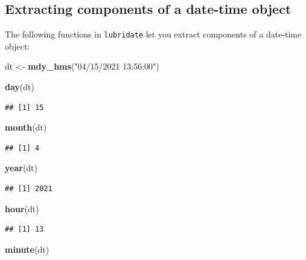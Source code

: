 \documentclass[
]{book}
\newenvironment{Shaded}{\begin{snugshade}}{\end{snugshade}}
\newcommand{\FunctionTok}[1]{\textcolor[rgb]{0.13,0.29,0.53}{\textbf{#1}}}
\newcommand{\NormalTok}[1]{#1}
\newcommand{\OtherTok}[1]{\textcolor[rgb]{0.56,0.35,0.01}{#1}}
\newcommand{\StringTok}[1]{\textcolor[rgb]{0.31,0.60,0.02}{#1}}
\begin{document}
\hypertarget{extracting-components-of-a-date-time-object}{%
\subsection{Extracting components of a date-time object}\label{extracting-components-of-a-date-time-object}}

The following functions in \texttt{lubridate} let you extract components of a date-time object:

\begin{Shaded}
\begin{Highlighting}[]
\NormalTok{dt }\OtherTok{\textless{}{-}} \FunctionTok{mdy\_hms}\NormalTok{(}\StringTok{"04/15/2021 13:56:00"}\NormalTok{)}

\FunctionTok{day}\NormalTok{(dt)}
\end{Highlighting}
\end{Shaded}

\begin{verbatim}
## [1] 15
\end{verbatim}

\begin{Shaded}
\begin{Highlighting}[]
\FunctionTok{month}\NormalTok{(dt)}
\end{Highlighting}
\end{Shaded}

\begin{verbatim}
## [1] 4
\end{verbatim}

\begin{Shaded}
\begin{Highlighting}[]
\FunctionTok{year}\NormalTok{(dt)}
\end{Highlighting}
\end{Shaded}

\begin{verbatim}
## [1] 2021
\end{verbatim}

\begin{Shaded}
\begin{Highlighting}[]
\FunctionTok{hour}\NormalTok{(dt)}
\end{Highlighting}
\end{Shaded}

\begin{verbatim}
## [1] 13
\end{verbatim}

\begin{Shaded}
\begin{Highlighting}[]
\FunctionTok{minute}\NormalTok{(dt)}
\end{Highlighting}
\end{Shaded}
\end{document}
